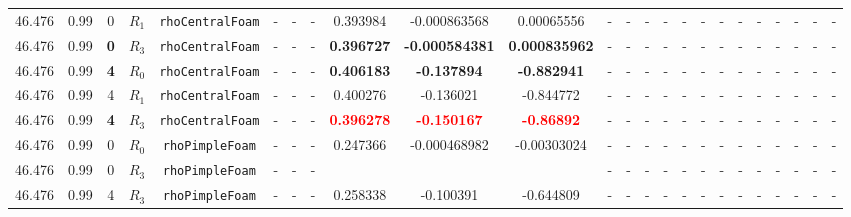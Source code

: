 \documentclass[12pt]{article}
\begin{document}
\begin{table}[H]
{\begin{tabular}{ccccc|ccc|ccc|ccc|ccc|ccccccc}
        46.476 &  0.99 & 0 & $R_1$ & \texttt{rhoCentralFoam} & - & - & - & 0.393984 & -0.000863568 & 0.00065556 & - & - & - & - & - & - & - & - & - & - & - & - & - \\
        \rowcolor{green!40}
        46.476 &  0.99 & \cellcolor{lime}\textbf{0} & \cellcolor{cyan}$R_3$ & \texttt{rhoCentralFoam} & - & - & - & \textbf{0.396727} & \textbf{-0.000584381} & \textbf{0.000835962} & - & - & - & - & - & - & - & - & - & - & - & - & - \\
        \rowcolor{green!10}
        46.476 &  0.99 & \textbf{4} & $R_0$ & \texttt{rhoCentralFoam} & - & - & - & \textbf{0.406183} & \textbf{-0.137894} & \textbf{-0.882941} & - & - & - & - & - & - & - & - & - & - & - & - & - \\
        \rowcolor{green!20}
        46.476 &  0.99 & 4 & $R_1$ & \texttt{rhoCentralFoam} & - & - & - & 0.400276 & -0.136021 & -0.844772 & - & - & - & - & - & - & - & - & - & - & - & - & - \\
        \rowcolor{green!40}
        46.476 &  0.99 & \cellcolor{lime}\textbf{4} & \cellcolor{cyan}$R_3$ & \texttt{rhoCentralFoam} & - & - & - & \textcolor{red}{\textbf{0.396278}} & \textcolor{red}{\textbf{-0.150167}} & \textcolor{red}{\textbf{-0.86892}} & - & - & - & - & - & - & - & - & - & - & - & - & - \\
         \rowcolor{blue!10}
        46.476 &  0.99 & 0 & $R_0$ & \texttt{rhoPimpleFoam} & - & - & - & 0.247366 & -0.000468982 & -0.00303024 & - & - & - & - & - & - & - & - & - & - & - & - & - \\ 
        \rowcolor{blue!40}
        46.476 &  0.99 & 0 & $R_3$ & \texttt{rhoPimpleFoam} & - & - & - &  & &  & - & - & - & - & - & - & - & - & - & - & - & - & - \\
        \rowcolor{blue!40}
        46.476 &  0.99 & 4 & $R_3$ & \texttt{rhoPimpleFoam} & - & - & - & 0.258338 & -0.100391 & -0.644809 & - & - & - & - & - & - & - & - & - & - & - & - & - \\

\end{tabular}}
\end{table}
\end{document}
